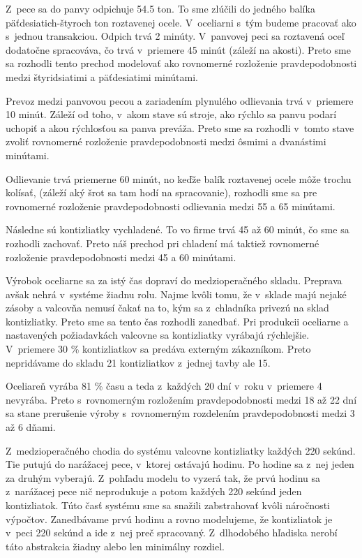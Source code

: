 \documentclass[]{article}
\begin{document}
Z~pece sa do panvy odpichuje 54.5 ton. To sme zlúčili do jedného balíka päťdesiatich-štyroch ton roztavenej ocele. V~oceliarni s~tým budeme pracovať ako s~jednou transakciou. Odpich trvá 2 minúty.
V~panvovej peci sa roztavená oceľ dodatočne spracováva, čo trvá v~priemere 45 minút (záleží na akosti). Preto sme sa rozhodli tento prechod modelovať ako rovnomerné rozloženie pravdepodobnosti medzi štyridsiatimi a päťdesiatimi minútami.

Prevoz medzi panvovou pecou a zariadením plynulého odlievania trvá v~priemere 10 minút. Záleží od toho, v~akom stave sú stroje, ako rýchlo sa panvu podarí uchopiť a akou rýchlosťou sa panva preváža. Preto sme sa rozhodli v~tomto stave zvoliť rovnomerné rozloženie pravdepodobnosti medzi ôsmimi a dvanástimi minútami.

Odlievanie trvá priemerne 60 minút, no keďže balík roztavenej ocele môže trochu kolísať, (záleží aký šrot sa tam hodí na spracovanie), rozhodli sme sa pre rovnomerné rozloženie pravdepodobnosti odlievania medzi 55 a 65 minútami.

Následne sú kontizliatky vychladené. To vo firme trvá 45 až 60 minút, čo sme sa rozhodli zachovať. Preto náš prechod pri chladení má taktiež rovnomerné rozloženie pravdepodobnosti medzi 45 a 60 minútami.

Výrobok oceliarne sa za istý čas dopraví do medzioperačného skladu. Preprava avšak nehrá v~systéme žiadnu rolu. Najme kvôli tomu, že v~sklade majú nejaké zásoby a valcovňa nemusí čakať na to, kým sa z~chladníka privezú na sklad kontizliatky. Preto sme sa tento čas rozhodli zanedbať. Pri produkcii oceliarne a nastavených požiadavkách valcovne sa kontizliatky vyrábajú rýchlejšie. V~priemere 30 \% kontizliatkov sa predáva externým zákazníkom. Preto nepridávame do skladu 21 kontizliatkov z~jednej tavby ale 15.

Oceliareň vyrába 81 \% času a teda z~každých 20 dní v~roku v~priemere 4 nevyrába. Preto s~rovnomerným rozložením pravdepodobnosti medzi 18 až 22 dní sa stane prerušenie výroby s~rovnomerným rozdelením pravdepodobnosti medzi 3 až 6 dňami.

Z~medzioperačného chodia do systému valcovne kontizliatky každých 220  sekúnd. Tie putujú do narážacej pece, v~ktorej ostávajú hodinu. Po hodine sa z~nej jeden za druhým vyberajú. Z~pohľadu modelu to vyzerá tak, že prvú hodinu sa z~narážacej pece nič neprodukuje a potom každých 220 sekúnd jeden kontizliatok. Túto časť systému sme sa snažili zabstrahovať kvôli náročnosti výpočtov. Zanedbávame prvú hodinu a rovno modelujeme, že kontizliatok je v~peci 220 sekúnd a ide z~nej preč spracovaný. Z~dlhodobého hľadiska nerobí táto abstrakcia žiadny alebo len minimálny rozdiel.
\end{document}
